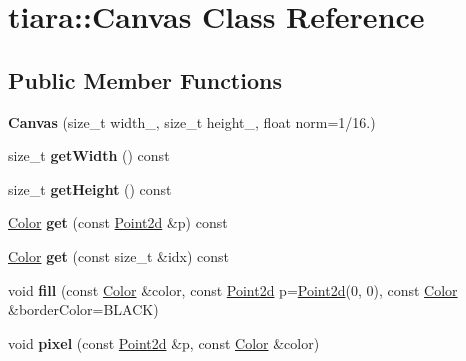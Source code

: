 \hypertarget{classtiara_1_1Canvas}{}\section{tiara\+::Canvas Class Reference}
\label{classtiara_1_1Canvas}
\subsection*{Public Member Functions}
\begin{DoxyCompactItemize}
\item 
\mbox{\label{classtiara_1_1Canvas_afd9efec9af575c0597f60c1949c4f6a0}} 
{\bfseries Canvas} (size\+\_\+t width\+\_\+, size\+\_\+t height\+\_\+, float norm=1/16.)
\item 
\mbox{\label{classtiara_1_1Canvas_a851e86a4b0b7784e9bf447782249eb1d}} 
size\+\_\+t {\bfseries get\+Width} () const
\item 
\mbox{\label{classtiara_1_1Canvas_a58703a7cccc1c5566ed015c25ee034a8}} 
size\+\_\+t {\bfseries get\+Height} () const
\item 
\mbox{\label{classtiara_1_1Canvas_aa135446bbe3884535e8aa6dfbc012db6}} 
\mbox{\hyperlink{classtiara_1_1Color}{Color}} {\bfseries get} (const \mbox{\hyperlink{classtiara_1_1Point2d}{Point2d}} \&p) const
\item 
\mbox{\label{classtiara_1_1Canvas_a3fd73debd67020e76d2e80e34628e525}} 
\mbox{\hyperlink{classtiara_1_1Color}{Color}} {\bfseries get} (const size\+\_\+t \&idx) const
\item 
\mbox{\label{classtiara_1_1Canvas_ab36bc90d0194e72d1b28de776dd185b6}} 
void {\bfseries fill} (const \mbox{\hyperlink{classtiara_1_1Color}{Color}} \&color, const \mbox{\hyperlink{classtiara_1_1Point2d}{Point2d}} p=\mbox{\hyperlink{classtiara_1_1Point2d}{Point2d}}(0, 0), const \mbox{\hyperlink{classtiara_1_1Color}{Color}} \&border\+Color=B\+L\+A\+CK)
\item 
\mbox{\label{classtiara_1_1Canvas_ae294d094de55a25094d817bdce151050}} 
void {\bfseries pixel} (const \mbox{\hyperlink{classtiara_1_1Point2d}{Point2d}} \&p, const \mbox{\hyperlink{classtiara_1_1Color}{Color}} \&color)

\end{DoxyCompactItemize}
